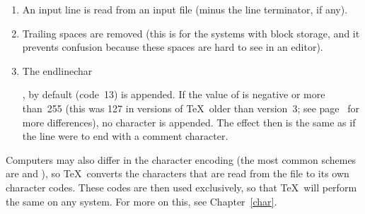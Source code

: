 \documentclass{book}
\begin{document}
\begin{enumerate}
\item An input line is read from an input file  (minus the
line terminator, if any).
\item Trailing spaces are removed (this is for the systems
with block storage, and it prevents confusion because these
spaces are hard to see in an editor).
\item The \csterm endlinechar\par, by default 
(code~13) is appended.
If the value of  is negative
\label{append:elc}%
or more than~255 (this was 127 in versions of \TeX\ older
than version~3; see page~\pageref{2vs3} for more differences),
no character is appended. 
The effect then is the same as
if the line were to end with a comment character.
\end{enumerate}


Computers may also differ in the character encoding
(the most common schemes are \ascii{} and \ebcdic{}), so \TeX\
converts the characters that are read from the file to its
own character codes. These codes are then used exclusively,
so that \TeX\ will perform the same on any system.
For more on this, see Chapter~\ref{char}.

\end{document}
